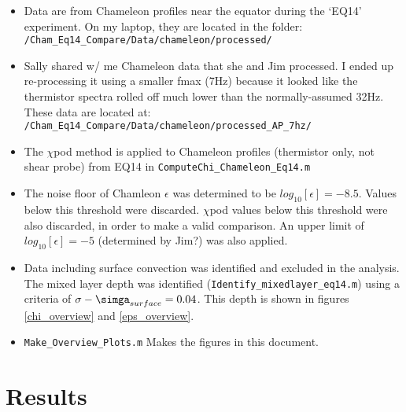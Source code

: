 \documentclass[11pt]{article}
\begin{document}
\begin{itemize}

\item Data are from Chameleon profiles near the equator during the `EQ14' experiment. On my laptop, they are located in the folder: \newline 
\verb+/Cham_Eq14_Compare/Data/chameleon/processed/+

\item Sally shared w/ me Chameleon data that she and Jim processed. I ended up re-processing it using a smaller fmax (7Hz) because it looked like the thermistor spectra rolled off much lower than the normally-assumed 32Hz. These data are located at: \newline
\verb+/Cham_Eq14_Compare/Data/chameleon/processed_AP_7hz/+

\item  The $\chi$pod method is applied to Chameleon profiles (thermistor only, not shear probe) from EQ14 in \verb+ComputeChi_Chameleon_Eq14.m+

\item The noise floor of Chamleon $\epsilon$ was determined to be $log_{10}[\epsilon]=-8.5$. Values below this threshold were discarded. $\chi$pod values below this threshold were also discarded, in order to make a valid comparison. An upper limit of $log_{10}[\epsilon]=-5$ (determined by Jim?) was also applied.

\item Data including surface convection was identified and excluded in the analysis. The mixed layer depth was identified (\verb+Identify_mixedlayer_eq14.m+) using a criteria of $\sigma -\simga_{surface}=0.04$. This depth is shown in figures \ref{chi_overview} and \ref{eps_overview}.

\item \verb+Make_Overview_Plots.m+ Makes the figures in this document.

\end{itemize}









\clearpage
\section{Results}
\end{document}
